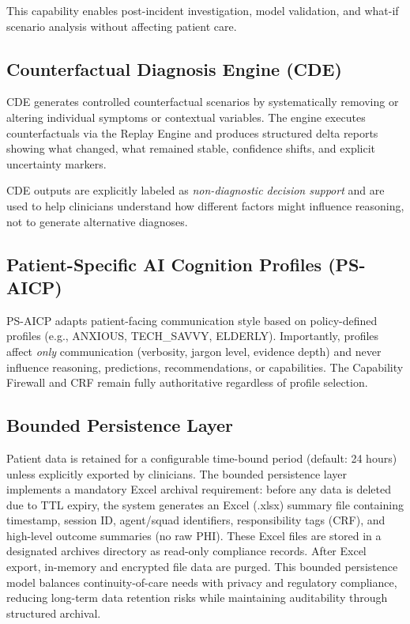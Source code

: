 \documentclass[journal]{IEEEtran}
\begin{document}
This capability enables post-incident investigation, model validation, and what-if scenario analysis without affecting patient care.

\subsection{Counterfactual Diagnosis Engine (CDE)}
CDE generates controlled counterfactual scenarios by systematically removing or altering individual symptoms or contextual variables. The engine executes counterfactuals via the Replay Engine and produces structured delta reports showing what changed, what remained stable, confidence shifts, and explicit uncertainty markers.

CDE outputs are explicitly labeled as \textit{non-diagnostic decision support} and are used to help clinicians understand how different factors might influence reasoning, not to generate alternative diagnoses.

\subsection{Patient-Specific AI Cognition Profiles (PS-AICP)}
PS-AICP adapts patient-facing communication style based on policy-defined profiles (e.g., ANXIOUS, TECH\_SAVVY, ELDERLY). Importantly, profiles affect \textit{only} communication (verbosity, jargon level, evidence depth) and never influence reasoning, predictions, recommendations, or capabilities. The Capability Firewall and CRF remain fully authoritative regardless of profile selection.

\subsection{Bounded Persistence Layer}
Patient data is retained for a configurable time-bound period (default: 24 hours) unless explicitly exported by clinicians. The bounded persistence layer implements a mandatory Excel archival requirement: before any data is deleted due to TTL expiry, the system generates an Excel (.xlsx) summary file containing timestamp, session ID, agent/squad identifiers, responsibility tags (CRF), and high-level outcome summaries (no raw PHI). These Excel files are stored in a designated archives directory as read-only compliance records. After Excel export, in-memory and encrypted file data are purged. This bounded persistence model balances continuity-of-care needs with privacy and regulatory compliance, reducing long-term data retention risks while maintaining auditability through structured archival.
\end{document}
